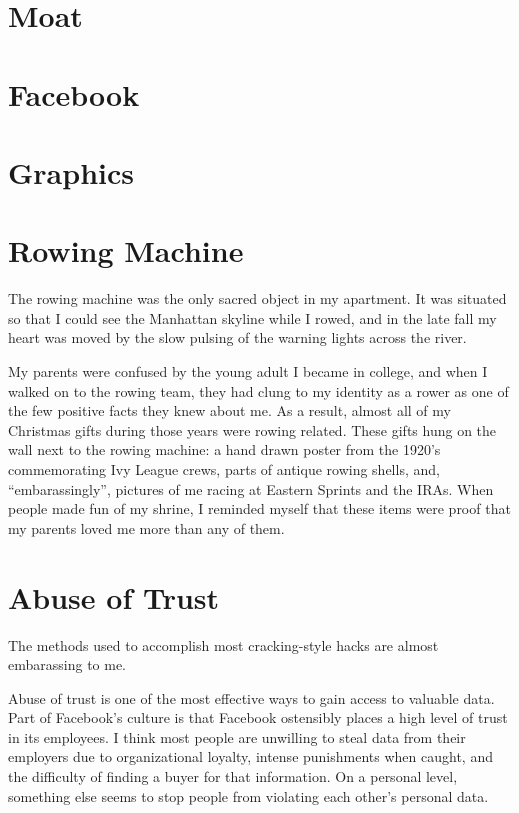 \documentclass[12pt]{article}
\begin{document}
\section{Moat}


\section{Facebook}


\section{Graphics}


\section{Rowing Machine}
The rowing machine was the only sacred object in my apartment.  It was situated
so that I could see the Manhattan skyline while I rowed, and in the late fall
my heart was moved by the slow pulsing of the warning lights across the river.

My parents were confused by the young adult I became in college, and when I
walked on to the rowing team, they had clung to my identity as a rower as one of
the few positive facts they knew about me.  As a result, almost all of my
Christmas gifts during those years were rowing related.  These gifts hung on the
wall next to the rowing machine: a hand drawn poster from the 1920's
commemorating Ivy League crews, parts of antique rowing shells, and,
``embarassingly'', pictures of me racing at Eastern Sprints and the IRAs.  When
people made fun of my shrine, I reminded myself that these items were proof that
my parents loved me more than any of them.


\section{Abuse of Trust}
The methods used to accomplish most cracking-style hacks are almost embarassing
to me. 

Abuse of trust is one of the most effective ways to gain access to valuable
data.  Part of Facebook's culture is that Facebook ostensibly places a high
level of trust in its employees.  I think most people are unwilling to steal
data from their employers due to organizational loyalty, intense punishments
when caught, and the difficulty of finding a buyer for that information.  On a
personal level, something else seems to stop people from violating each other's
personal data.
\end{document}
